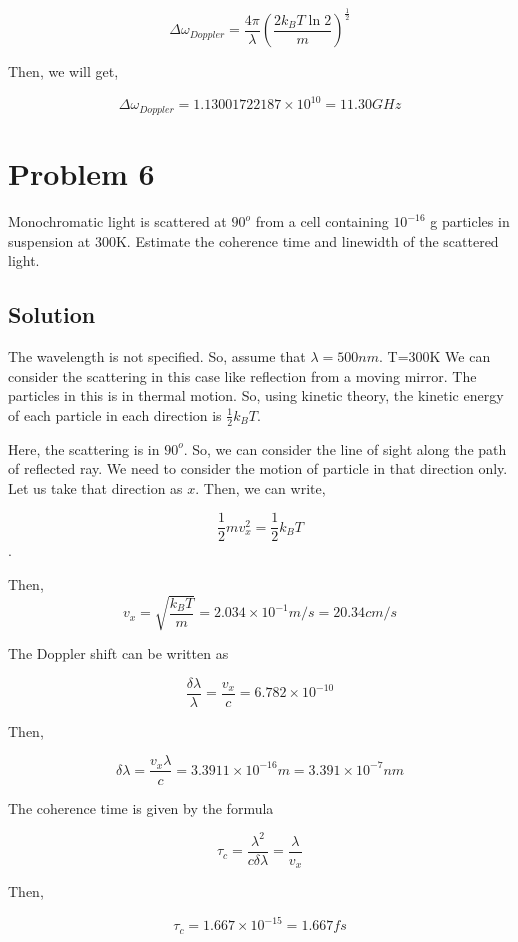 \documentclass[a4paper,11pt]{article}
\begin{document}
\begin{equation}
\label{eq:org222a7ef}
\Delta\omega_{Doppler} = \frac{4\pi}{\lambda} \left(\frac{2 k_B T  \ln 2}{m}\right)^{\frac{1}{2}} 
\end{equation}

Then, we will get,

$$\Delta\omega_{Doppler} = 1.13001722187\times 10^{10} = 11.30 GHz$$

\newpage
\section*{Problem 6}
\label{sec:org785bfd0}
Monochromatic light is scattered at \(90^o\) from a cell containing \(10^{-16}\) g particles in suspension at 300K. Estimate the coherence time and linewidth of the scattered light.
\subsection*{Solution}
\label{sec:org5b19e73}

The wavelength is not specified. So, assume that \(\lambda = 500nm\). T=300K
We can consider the scattering in this case like reflection from a moving mirror. The particles in this is in thermal motion. So, using kinetic theory, the kinetic energy of each particle in each direction is \(\frac{1}{2}k_BT\).

Here, the scattering is in \(90^o\). So, we can consider the line of sight along the path of reflected ray. We need to consider the motion of particle in that direction only. Let us take that direction as \(x\). Then, we can write,

$$\frac{1}{2} m v_x^2 = \frac{1}{2} k_B T$$.

Then, $$v_x = \sqrt{\frac{k_BT}{m}} = 2.034\times 10^{-1} m/s = 20.34cm/s$$

The Doppler shift can be written as

$$\frac{\delta\lambda}{\lambda} = \frac{v_x}{c} = 6.782\times10^{-10}$$

Then, 

$$\delta\lambda = \frac{v_x\lambda}{c} = 3.3911\times 10^{-16} m = 3.391\times 10^{-7}nm $$

The coherence time is given by the formula

$$\tau_c = \frac{\lambda^2}{c\delta \lambda} = \frac{\lambda}{v_x}$$

Then,

$$\tau_c = 1.667\times 10^{-15} = 1.667 fs $$
\end{document}
